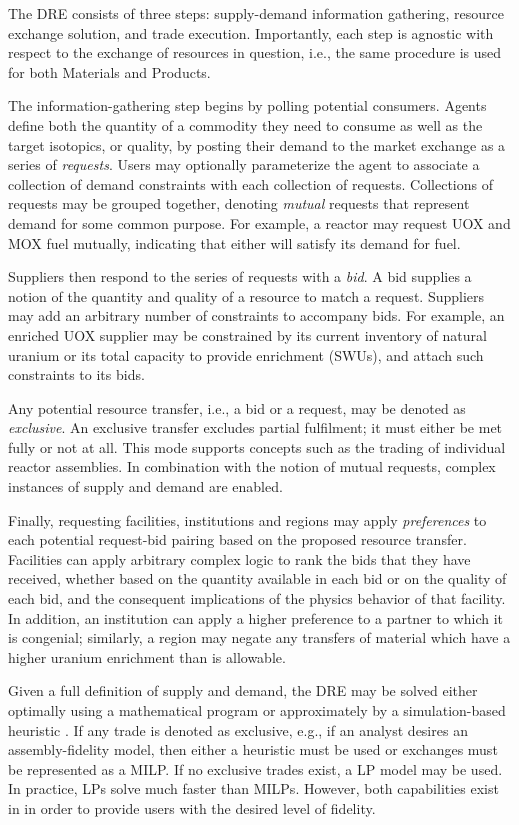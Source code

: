 The \gls{DRE} consists of three steps: supply-demand information
gathering, resource exchange solution, and trade execution. Importantly, each
step is agnostic with respect to the exchange of resources in question, i.e.,
the same procedure is used for both Materials and Products.

The information-gathering step begins by polling potential consumers. Agents
define both the quantity of a commodity they need to consume as well as the
target isotopics, or quality, by posting their demand to the market exchange as
a series of \textit{requests}. Users may optionally parameterize the agent to
associate a collection of demand constraints with each collection of requests.
Collections of requests may be grouped together, denoting \textit{mutual}
requests that represent demand for
some common purpose. For example, a reactor may request \gls{UOX} and \gls{MOX} fuel
mutually, indicating that either will satisfy its demand for fuel.

Suppliers then respond to the series of requests with a \textit{bid}. A bid
supplies a notion of the quantity and quality of a resource to match a
request. Suppliers may add an arbitrary number of constraints to accompany
bids. For example, an enriched \gls{UOX} supplier may be constrained by its current
inventory of natural uranium or its total capacity to provide enrichment (SWUs), and
attach such constraints to its bids.

Any potential resource transfer, i.e., a bid or a request, may be denoted as
\textit{exclusive}. An exclusive transfer excludes partial fulfilment; it must
either be met fully or not at all. This mode supports concepts such as the
trading of individual reactor assemblies.  In combination with the notion of
mutual requests, complex instances
of supply and demand are enabled.

Finally, requesting facilities, institutions and regions may apply
\textit{preferences} to each potential request-bid pairing based on the proposed
resource transfer. Facilities can apply arbitrary complex logic to rank the bids
that they have received, whether based on the quantity available in each bid or
on the quality of each bid, and the consequent implications of the physics behavior
of that facility. In addition, an institution can apply a higher preference to a
partner to which it is congenial; similarly, a region may negate any transfers
of material which have a higher uranium enrichment than is allowable.

Given a full definition of supply and demand, the \gls{DRE} may be solved either
optimally using a mathematical program or approximately by a simulation-based
heuristic \cite{gidden_agent-based_2014}. If any trade is denoted as exclusive, e.g., if an
analyst desires an assembly-fidelity model, then either a heuristic must be used
or exchanges must be represented as a \gls{MILP}. If no exclusive trades exist,
a \gls{LP} model may be used. In practice, \glspl{LP} solve much faster than
\glspl{MILP}. However, both capabilities exist in \Cyclus in order to
provide users with the desired level of fidelity.

